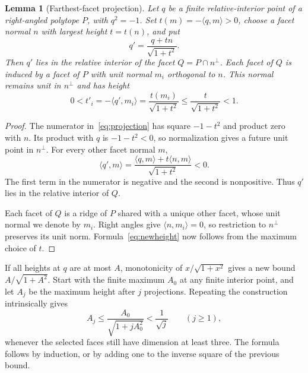 \documentclass[11pt]{article}
\newtheorem{lemma}[theorem]{Lemma}
\theoremstyle{remark}
\newcommand{\ip}[2]{\langle #1,#2\rangle}
\begin{document}
\begin{lemma}[Farthest-facet projection]\label{lem:projection}
Let $q$ be a finite relative-interior point of a right-angled polytope
$P$, with $q^2=-1$. Set $t(m)=-\ip{q}{m}>0$, choose a facet normal
$n$ with largest height $t=t(n)$, and put
\begin{equation}\label{eq:projection}
 q'=\frac{q+tn}{\sqrt{1+t^2}}.
\end{equation}
Then $q'$ lies in the relative interior of the facet
$Q=P\cap n^\perp$. Each facet of $Q$ is induced by a facet of $P$
with unit normal $m_i$ orthogonal to $n$. This normal remains unit
in $n^\perp$ and has height
\begin{equation}\label{eq:newheight}
 0<t'_i=-\ip{q'}{m_i}
       =\frac{t(m_i)}{\sqrt{1+t^2}}
       \le\frac{t}{\sqrt{1+t^2}}<1.
\end{equation}
\end{lemma}
\begin{proof}
The numerator in~\eqref{eq:projection} has square $-1-t^2$ and
product zero with $n$. Its product with $q$ is $-1-t^2<0$, so
normalization gives a future unit point in $n^\perp$. For every
other facet normal $m$,
\begin{equation}\label{eq:allwall}
 \ip{q'}{m}=\frac{\ip{q}{m}+t\ip{n}{m}}{\sqrt{1+t^2}}<0.
\end{equation}
The first term in the numerator is negative and the second is
nonpositive. Thus $q'$ lies in the relative interior of $Q$.

Each facet of $Q$ is a ridge of $P$ shared with a unique other
facet, whose unit normal we denote by $m_i$.
Right angles give $\ip{n}{m_i}=0$, so restriction to $n^\perp$
preserves its unit norm. Formula~\eqref{eq:newheight} now follows
from the maximum choice of $t$.
\end{proof}

If all heights at $q$ are at most $A$, monotonicity of
$x/\sqrt{1+x^2}$ gives a new bound
$A/\sqrt{1+A^2}$. Start with the finite maximum $A_0$ at any finite
interior point, and let $A_j$ be the maximum height after $j$
projections. Repeating the construction intrinsically gives
\begin{equation}\label{eq:iterate}
 A_j\le\frac{A_0}{\sqrt{1+jA_0^2}}<\frac1{\sqrt j}
 \qquad(j\ge1),
\end{equation}
whenever the selected faces still have dimension at least three.
The formula follows by induction, or by adding one to the inverse
square of the previous bound.
\end{document}
